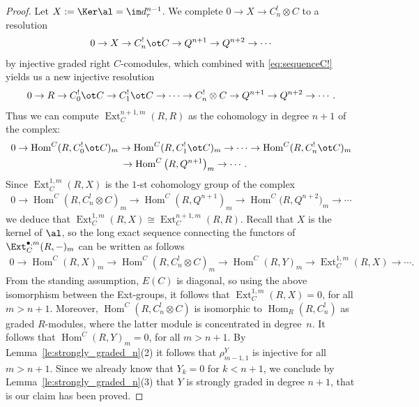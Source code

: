\begin{proof}
Let $X:=\Ker \al=\im d^{n-1}_r$. We complete $0 \rightarrow {X} \rightarrow C_n^! \otimes C$ to a resolution
\begin{gather*}
 0 \rightarrow X\rightarrow C_n^!\ot C \rightarrow Q^{n+1} \rightarrow Q^{n+2} \rightarrow \cdots
\end{gather*}
by injective graded right $C$-comodules, which combined with \eqref{eq:sequenceC!} yields us a new injective resolution
\begin{gather*} %
0 \rightarrow R \rightarrow C_0^!\ot C \rightarrow C_1^!\ot C\rightarrow \dots \rightarrow C_n^! \otimes C \rightarrow Q^{n+1} \rightarrow Q^{n+2} \rightarrow \cdots.
\end{gather*}
Thus we can compute $\operatorname{Ext}_C^{n+1,m}(R,R)$ as the cohomology in degree $n+1$ of the complex:
\begin{gather*}
 0 \rightarrow \operatorname{Hom}^C(R,C_0^!\ot C)_m \rightarrow \operatorname{Hom}^C(R,C_1^!\ot C)_m \rightarrow \dots \rightarrow \operatorname{Hom}^C(R, C_n^!\ot C)_m\\
 \hphantom{0}{} \rightarrow \operatorname{Hom}^C\big(R,Q^{n+1}\big)_m \rightarrow \cdots.
\end{gather*}
Since $\operatorname{Ext}^{1,m}_C(R,X)$ is the $1$-st cohomology group of the complex
\begin{gather*}
 0 \rightarrow \operatorname{Hom}^C(R,C_n^! \otimes C)_m \rightarrow \operatorname{Hom}^C(R,Q^{n+1})_m \rightarrow \operatorname{Hom}^C\big(R,Q^{n+2}\big)_m \rightarrow \cdots
\end{gather*}
we deduce that $\operatorname{Ext}^{1,m}_C(R,X)\cong\operatorname{Ext}_C^{n+1,m}(R,R)$. Recall that $X$ is the kernel of $\al$, so the long exact sequence connecting the functors of $\Ext^{\bullet,m}_C(R,-)_m$ can be written as follows
\begin{gather*}
 0 \rightarrow \operatorname{Hom}^C(R,X)_m \rightarrow \operatorname{Hom}^C(R, C_n^! \otimes C)_m \rightarrow \operatorname{Hom}^C(R,Y)_m \rightarrow \operatorname{Ext}^{1,m}_C(R,X) \rightarrow \cdots.
\end{gather*}
From the standing assumption, $E(C)$ is diagonal, so using the above isomorphism between the Ext-groups, it follows that $\operatorname{Ext}_C^{1,m}(R,X)=0$, for all $m>n+1$. Moreover, $\operatorname{Hom}^C(R,C_n^! \otimes C)$ is isomorphic to $\operatorname{Hom}_R(R,C_n^! )$ as graded $R$-modules, where the latter module is concentrated in degree~$n$. It follows that $\operatorname{Hom}^C(R,Y)_m=0$, for all $m > n+1$. By Lemma~\ref{le:strongly_graded_n}(2) it follows that $\rho^Y_{m-1,1}$ is injective for all $m>n+1$. Since we already know that $Y_k=0$ for $k<n+1$, we conclude by Lemma~\ref{le:strongly_graded_n}(3) that $Y$ is strongly graded in degree $n+1$, that is our claim has been proved.


\end{proof}
